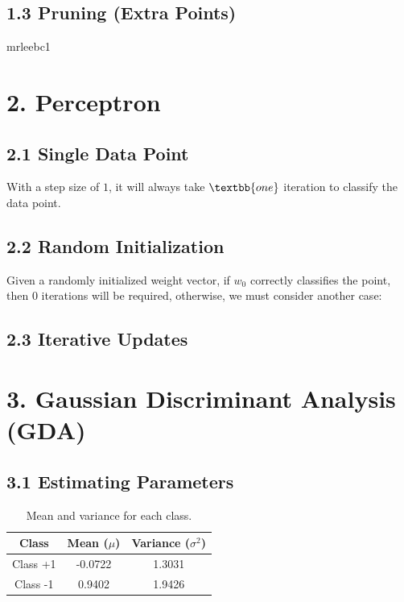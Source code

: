 \documentclass[12pt]{article}
\begin{document}
\subsection*{1.3 Pruning (Extra Points)}

mrleebc1

\section*{2. Perceptron}
\subsection*{2.1 Single Data Point}
With a step size of $1$, it will always take $\textbb{one}$ iteration to classify the data point.

\subsection*{2.2 Random Initialization}
Given a randomly initialized weight vector, if $w_0$ correctly classifies the point, then $0$ iterations will be required, otherwise, we must consider another case: 

\subsection*{2.3 Iterative Updates}

\section*{3. Gaussian Discriminant Analysis (GDA)}

\subsection*{3.1 Estimating Parameters}
\begin{table}[h!]
\centering
\begin{tabular}{|c|c|c|}
\hline
\textbf{Class} & \textbf{Mean (\(\mu\))} & \textbf{Variance (\(\sigma^2\))} \\ \hline
Class +1       & -0.0722                 & 1.3031                          \\ \hline
Class -1       & 0.9402                  & 1.9426                          \\ \hline
\end{tabular}
\caption{Mean and variance for each class.}
\label{tab:class_stats}
\end{table}
\end{document}
